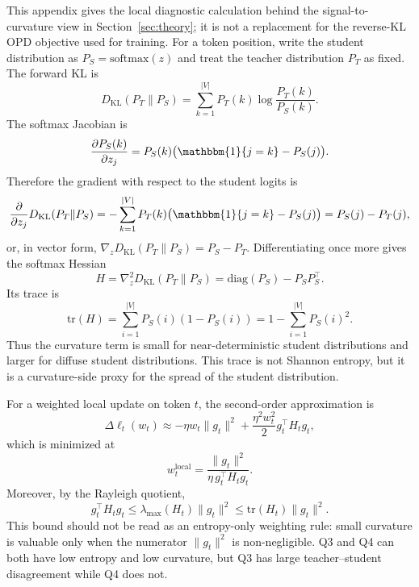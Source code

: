 \documentclass{article}
\newcommand{\KL}{\mathrm{KL}}
\newcommand{\tr}{\mathrm{tr}}
\begin{document}
This appendix gives the local diagnostic calculation behind the signal-to-curvature view in Section~\ref{sec:theory}; it is not a replacement for the reverse-KL OPD objective used for training.
For a token position, write the student distribution as $P_S = \mathrm{softmax}(z)$ and treat the teacher distribution $P_T$ as fixed.
The forward KL is
\begin{equation}
    D_{\KL}(P_T \| P_S)
    = \sum_{k=1}^{|V|} P_T(k) \log \frac{P_T(k)}{P_S(k)}.
\end{equation}
The softmax Jacobian is
\begin{equation}
    \frac{\partial P_S(k)}{\partial z_j}
    = P_S(k)\bigl(\mathbbm{1}\{j=k\} - P_S(j)\bigr).
\end{equation}
Therefore the gradient with respect to the student logits is
\begin{equation}
    \frac{\partial}{\partial z_j} D_{\KL}(P_T \| P_S)
    = -\sum_{k=1}^{|V|} P_T(k)\bigl(\mathbbm{1}\{j=k\} - P_S(j)\bigr)
    = P_S(j) - P_T(j),
\end{equation}
or, in vector form, $\nabla_z D_{\KL}(P_T \| P_S) = P_S - P_T$.
Differentiating once more gives the softmax Hessian
\begin{equation}
    H
    = \nabla_z^2 D_{\KL}(P_T \| P_S)
    = \mathrm{diag}(P_S) - P_S P_S^\top.
\end{equation}
Its trace is
\begin{equation}
    \tr(H)
    = \sum_{i=1}^{|V|} P_S(i)(1-P_S(i))
    = 1 - \sum_{i=1}^{|V|} P_S(i)^2.
\end{equation}
Thus the curvature term is small for near-deterministic student distributions and larger for diffuse student distributions.
This trace is not Shannon entropy, but it is a curvature-side proxy for the spread of the student distribution.

For a weighted local update on token $t$, the second-order approximation is
\begin{equation}
    \Delta \ell_t(w_t)
    \approx
    -\eta w_t \|g_t\|^2
    + \frac{\eta^2 w_t^2}{2} g_t^\top H_t g_t,
\end{equation}
which is minimized at
\begin{equation}
    w_t^{\mathrm{local}}
    = \frac{\|g_t\|^2}{\eta\, g_t^\top H_t g_t}.
\end{equation}
Moreover, by the Rayleigh quotient,
\begin{equation}
    g_t^\top H_t g_t
    \leq \lambda_{\max}(H_t)\|g_t\|^2
    \leq \tr(H_t)\|g_t\|^2.
\end{equation}
This bound should not be read as an entropy-only weighting rule: small curvature is valuable only when the numerator $\|g_t\|^2$ is non-negligible.
Q3 and Q4 can both have low entropy and low curvature, but Q3 has large teacher--student disagreement while Q4 does not.
\end{document}
